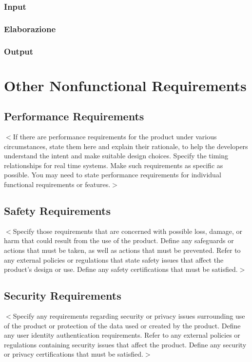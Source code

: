 \documentclass{scrreprt}
\begin{document}
\subsection*{Input}
\subsection*{Elaborazione}
\subsection*{Output}


\chapter{Other Nonfunctional Requirements}

\section{Performance Requirements}
$<$If there are performance requirements for the product under various 
circumstances, state them here and explain their rationale, to help the 
developers understand the intent and make suitable design choices. Specify the 
timing relationships for real time systems. Make such requirements as specific 
as possible. You may need to state performance requirements for individual 
functional requirements or features.$>$

\section{Safety Requirements}
$<$Specify those requirements that are concerned with possible loss, damage, or 
harm that could result from the use of the product. Define any safeguards or 
actions that must be taken, as well as actions that must be prevented. Refer to 
any external policies or regulations that state safety issues that affect the 
product’s design or use. Define any safety certifications that must be 
satisfied.$>$

\section{Security Requirements}
$<$Specify any requirements regarding security or privacy issues surrounding use 
of the product or protection of the data used or created by the product. Define 
any user identity authentication requirements. Refer to any external policies or 
regulations containing security issues that affect the product. Define any 
security or privacy certifications that must be satisfied.$>$
\end{document}
